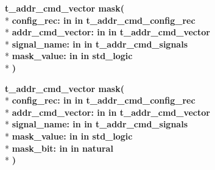 \begin{DoxyCompactItemize}
{\bfseries {\bfseries {\bfseries {\bf t\+\_\+addr\+\_\+cmd\+\_\+vector}} \textcolor{vhdlchar}{ }}} {\bf mask}{\bfseries  ( }\\*
{\bfseries \textcolor{vhdlchar}{config\+\_\+rec\+: }\textcolor{stringliteral}{in }\textcolor{vhdlchar}{in t\+\_\+addr\+\_\+cmd\+\_\+config\+\_\+rec}}\\*
{\bfseries \textcolor{vhdlchar}{addr\+\_\+cmd\+\_\+vector\+: }\textcolor{stringliteral}{in }\textcolor{vhdlchar}{in t\+\_\+addr\+\_\+cmd\+\_\+vector}}\\*
{\bfseries \textcolor{vhdlchar}{signal\+\_\+name\+: }\textcolor{stringliteral}{in }\textcolor{vhdlchar}{in t\+\_\+addr\+\_\+cmd\+\_\+signals}}\\*
{\bfseries \textcolor{vhdlchar}{mask\+\_\+value\+: }\textcolor{stringliteral}{in }\textcolor{vhdlchar}{in std\+\_\+logic}}\\*
{\bfseries  )} 
\item 
{\bfseries {\bfseries {\bfseries {\bf t\+\_\+addr\+\_\+cmd\+\_\+vector}} \textcolor{vhdlchar}{ }}} {\bf mask}{\bfseries  ( }\\*
{\bfseries \textcolor{vhdlchar}{config\+\_\+rec\+: }\textcolor{stringliteral}{in }\textcolor{vhdlchar}{in t\+\_\+addr\+\_\+cmd\+\_\+config\+\_\+rec}}\\*
{\bfseries \textcolor{vhdlchar}{addr\+\_\+cmd\+\_\+vector\+: }\textcolor{stringliteral}{in }\textcolor{vhdlchar}{in t\+\_\+addr\+\_\+cmd\+\_\+vector}}\\*
{\bfseries \textcolor{vhdlchar}{signal\+\_\+name\+: }\textcolor{stringliteral}{in }\textcolor{vhdlchar}{in t\+\_\+addr\+\_\+cmd\+\_\+signals}}\\*
{\bfseries \textcolor{vhdlchar}{mask\+\_\+value\+: }\textcolor{stringliteral}{in }\textcolor{vhdlchar}{in std\+\_\+logic}}\\*
{\bfseries \textcolor{vhdlchar}{mask\+\_\+bit\+: }\textcolor{stringliteral}{in }\textcolor{vhdlchar}{in natural}}\\*
{\bfseries  )} 
\end{DoxyCompactItemize}
